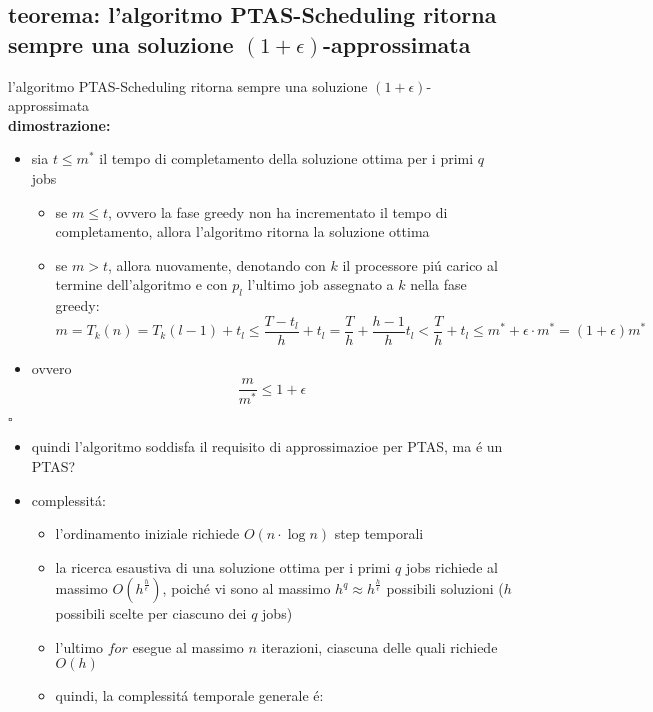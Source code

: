 \subsection*{teorema: l'algoritmo PTAS-Scheduling ritorna sempre una soluzione $(1+\epsilon)$-approssimata} 
\begin{flushleft}
	l'algoritmo PTAS-Scheduling ritorna sempre una soluzione $(1+\epsilon)$-approssimata \newline \\
	\textbf{dimostrazione:}
	\begin{itemize}
		\item sia $t\leq m^*$ il tempo di completamento della soluzione ottima per i primi $q$ jobs
		\begin{itemize}
			\item se $m\leq t$, ovvero la fase greedy non ha incrementato il tempo di completamento, allora l'algoritmo ritorna la soluzione ottima
			\item se $m>t$, allora nuovamente, denotando con $k$ il processore pi\'u carico al termine dell'algoritmo e con $p_l$ l'ultimo job assegnato a $k$ nella fase greedy:
				$$m=T_k(n)=T_k(l-1)+t_l\leq\frac{T-t_l}{h}+t_l=\frac{T}{h}+\frac{h-1}{h}t_l<\frac{T}{h}+t_l\leq m^*+\epsilon\cdot m^*=(1+\epsilon)m^*$$
		\end{itemize}
		\item ovvero
			$$\frac{m}{m^*}\leq 1+\epsilon$$
	\end{itemize}
	\hfill$\square$
	\begin{itemize}
		\item quindi l'algoritmo soddisfa il requisito di approssimazioe per PTAS, ma \'e un PTAS?
		\item complessit\'a:
		\begin{itemize}
			\item l'ordinamento iniziale richiede $O(n\cdot\log n)$ step temporali
			\item la ricerca esaustiva di una soluzione ottima per i primi $q$ jobs richiede al massimo $O(h^\frac{h}{\epsilon})$, poich\'e vi sono al  massimo $h^q\approx h^\frac{h}{\epsilon}$ possibili soluzioni ($h$ possibili scelte per ciascuno dei $q$ jobs)
			\item l'ultimo $for$ esegue al massimo $n$ iterazioni, ciascuna delle quali richiede $O(h)$
			\item quindi, la complessit\'a temporale generale \'e:

\end{itemize}
\end{itemize}
\end{flushleft}
